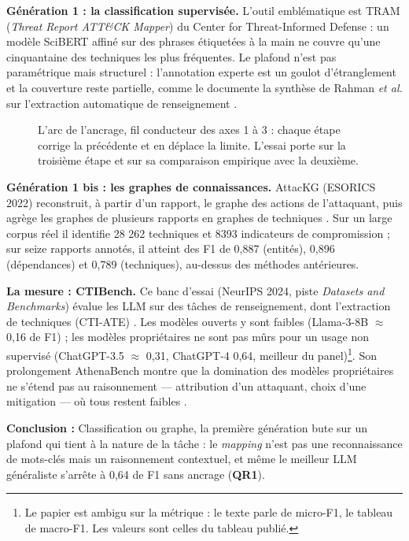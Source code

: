 \textbf{Génération 1 : la classification supervisée.} L'outil emblématique est TRAM (\emph{Threat Report ATT\&CK Mapper}) du Center for Threat-Informed Defense \cite{tram} : un modèle SciBERT affiné sur des phrases étiquetées à la main ne couvre qu'une cinquantaine des techniques les plus fréquentes. Le plafond n'est pas paramétrique mais structurel : l'annotation experte est un goulot d'étranglement et la couverture reste partielle, comme le documente la synthèse de Rahman \emph{et al.} sur l'extraction automatique de renseignement \cite{rahman}.

\begin{figure}[htbp]
\centering
{}
\caption{L'arc de l'ancrage, fil conducteur des axes 1 à 3 : chaque étape corrige la précédente et en déplace la limite. L'essai porte sur la troisième étape et sur sa comparaison empirique avec la deuxième.}\label{fig:arc-ancrage}
\end{figure}

\textbf{Génération 1 bis : les graphes de connaissances.} AttacKG (ESORICS 2022) reconstruit, à partir d'un rapport, le graphe des actions de l'attaquant, puis agrège les graphes de plusieurs rapports en graphes de techniques \cite{attackg}. Sur un large corpus réel il identifie 28 262 techniques et 8393 indicateurs de compromission ; sur seize rapports annotés, il atteint des F1 de 0,887 (entités), 0,896 (dépendances) et 0,789 (techniques), au-dessus des méthodes antérieures.

\textbf{La mesure : CTIBench.} Ce banc d'essai (NeurIPS 2024, piste \emph{Datasets and Benchmarks}) évalue les LLM sur des tâches de renseignement, dont l'extraction de techniques (CTI-ATE) \cite{ctibench}. Les modèles ouverts y sont faibles (Llama-3-8B $\approx$ 0,16 de F1) ; les modèles propriétaires ne sont pas mûrs pour un usage non supervisé (ChatGPT-3.5 $\approx$ 0,31, ChatGPT-4 0,64, meilleur du panel)\footnote{Le papier est ambigu sur la métrique : le texte parle de micro-F1, le tableau de macro-F1. Les valeurs sont celles du tableau publié.}. Son prolongement AthenaBench montre que la domination des modèles propriétaires ne s'étend pas au raisonnement --- attribution d'un attaquant, choix d'une mitigation --- où tous restent faibles \cite{athenabench}.

\begin{encadre}
\textbf{Conclusion :} Classification ou graphe, la première génération bute sur un plafond qui tient à la nature de la tâche : le \emph{mapping} n'est pas une reconnaissance de mots-clés mais un raisonnement contextuel, et même le meilleur LLM généraliste s'arrête à 0,64 de F1 sans ancrage (\textbf{QR1}).
\end{encadre}

